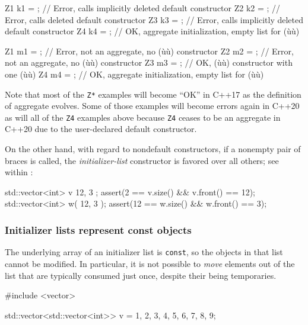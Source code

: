 \begin{emcppslisting}
{    Z1 k1 = {};    // Error, calls implicitly deleted default constructor
    Z2 k2 = {};    // Error, calls deleted default constructor
    Z3 k3 = {};    // Error, calls implicitly deleted default constructor
    Z4 k4 = {};    // OK, aggregate initialization, empty list for (ù{}ù)

    Z1 m1 = {{}};  // Error, not an aggregate, no (ù{}ù) constructor
    Z2 m2 = {{}};  // Error, not an aggregate, no (ù{}ù) constructor
    Z3 m3 = {{}};  // OK, (ù{}ù) constructor with one (ù{}ù)
    Z4 m4 = {{}};  // OK, aggregate initialization, empty list for (ù{}ù)
}
\end{emcppslisting}
    

\noindent Note that most of the \lstinline!Z*! examples will become ``OK'' in C++17
as the definition of aggregate evolves. Some of those examples will
become errors again in C++20 as will all of the \lstinline!Z4! examples
above because \lstinline!Z4! ceases to be an aggregate in C++20 due to the
user-declared default constructor.

On the other hand, with regard to nondefault constructors, if a nonempty
pair of braces is called, the \emph{initializer-list} constructor is
favored over all others; see  within :

\begin{emcppslisting}
    std::vector<int> v{ 12, 3 };
    assert(2 == v.size() && v.front() == 12);
    std::vector<int> w( 12, 3 );
    assert(12 == w.size() && w.front() == 3);
\end{emcppslisting}
    

\subsubsection[Initializer lists represent \lstinline!const! objects]{Initializer lists represent {\SubsubsecCode const} objects}\label{initializer-lists-represent-const-objects}

The underlying array of an initializer list is \lstinline!const!, so the
objects in that list cannot be modified. In particular, it is not
possible to \emph{move} elements out of the list that are typically
consumed just once, despite their being temporaries.

\begin{emcppslisting}
#include <vector>

std::vector<std::vector<int>> v = {{1, 2, 3},
                                   {4, 5, 6},
                                   {7, 8},
                                   {9}};
\end{emcppslisting}
    

